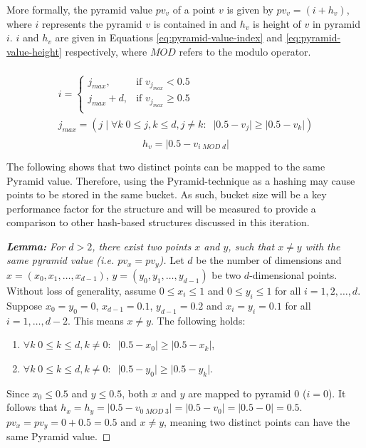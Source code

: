 \begin{figure}
		\label{fig:pyramid-tree-partition}
\end{figure}

More formally, the pyramid value $pv_v$ of a point $v$ is given by $pv_v = (i + h_v)$, where $i$ represents the pyramid $v$ is contained in and $h_v$ is height of $v$ in pyramid $i$. $i$ and $h_v$ are given in Equations \ref{eq:pyramid-value-index} and \ref{eq:pyramid-value-height} respectively, where $MOD$ refers to the modulo operator.

\begin{multline}\\
	i = \begin{cases}
		j_{max},         & \text{if }v_{j_{max}} < 0.5\\
		j_{max} + d,   & \text{if }v_{j_{max}} \geq 0.5\\
	\end{cases} \\
	j_{max} = \left( j \;|\; \forall k \; 0 \leq j,k \leq d, j \neq k: \;\; \lvert 0.5 - v_j \rvert \geq \lvert 0.5 - v_k \rvert \right) \\
	\label{eq:pyramid-value-index}
\end{multline}
\begin{equation}
	h_v = \lvert 0.5 - v_{i \; MOD \; d} \rvert
	\label{eq:pyramid-value-height}
\end{equation}

The following shows that two distinct points can be mapped to the same Pyramid value. Therefore, using the Pyramid-technique as a hashing may cause points to be stored in the same bucket. As such, bucket size will be a key performance factor for the structure and will be measured to provide a comparison to other hash-based structures discussed in this iteration.

\begin{proof}[\textbf{Lemma: } For $d > 2$, there exist two points $x$ and $y$, such that $x \neq y$ with the same pyramid value (i.e. $pv_x = pv_y$)]

Let $d$ be the number of dimensions and $x = (x_0, x_1, \dots, x_{d -1})$, $y = (y_0, y_1, \dots, y_{d - 1})$ be two $d$-dimensional points. Without loss of generality, assume $0 \leq x_i \leq 1$ and $0 \leq y_i \leq 1$ for all $i = 1, 2, \dots, d$. Suppose $x_0 = y_0 = 0$, $x_{d - 1} = 0.1$, $y_{d - 1} = 0.2$ and $x_i = y_i = 0.1$ for all $i = 1, \dots, {d - 2}$. This means $x \neq y$. The following holds:
\begin{enumerate}
	\item $\forall k \; 0 \leq k \leq d, k \neq 0: \;\; \lvert 0.5 - x_0 \rvert \geq \lvert 0.5 - x_k \rvert$,
	\item  $\forall k \; 0 \leq k \leq d, k \neq 0: \;\; \lvert 0.5 - y_0 \rvert \geq \lvert 0.5 - y_k \rvert$.
\end{enumerate}
Since $x_0 \leq 0.5$ and $y \leq 0.5$, both $x$ and $y$ are mapped to pyramid 0 ($i = 0$). It follows that $h_x = h_y = \lvert 0.5 - v_{0 \; MOD \; 3} \rvert = \lvert 0.5 - v_{0} \rvert = \lvert 0.5 - 0 \rvert = 0.5$. $pv_x = pv_y = 0 + 0.5 = 0.5$ and $x \neq y$, meaning two distinct points can have the same Pyramid value.

\end{proof}

